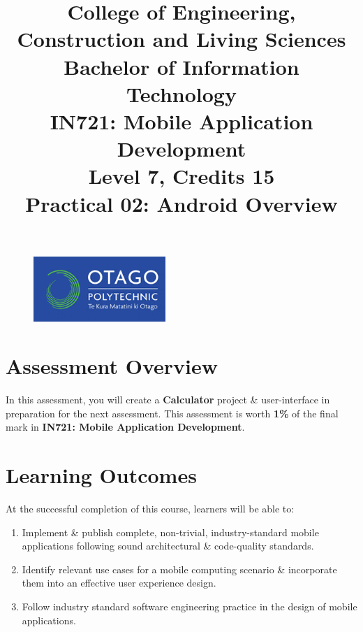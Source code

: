\documentclass{article}
\author{}
\begin{document}
\begin{figure}
	\centering
	\includegraphics[width=50mm]{./img/logo.png}
\end{figure}

\title{College of Engineering, Construction and Living Sciences\\Bachelor of Information Technology\\IN721: Mobile Application Development\\Level 7, Credits 15\\\textbf{Practical 02: Android Overview}}
\date{}
\maketitle

\section*{Assessment Overview}
In this assessment, you will create a \textbf{Calculator} project \& user-interface in preparation for the next assessment. This assessment is worth \textbf{1\%} of the final mark in \textbf{IN721: Mobile Application Development}.

\section*{Learning Outcomes}
At the successful completion of this course, learners will be able to:
\begin{enumerate}
	\item Implement \& publish complete, non-trivial, industry-standard mobile applications following sound architectural \& code-quality standards.
	\item Identify relevant use cases for a mobile computing scenario \& incorporate them into an effective user experience design.
	\item Follow industry standard software engineering practice in the design of mobile applications.
\end{enumerate}
\end{document}
